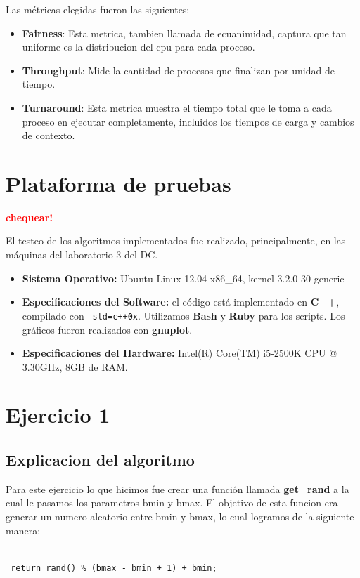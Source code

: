 \documentclass[a4paper]{article}
\begin{document}
Las métricas elegidas fueron las siguientes:
\begin{itemize}

\item \textbf{Fairness}: Esta metrica, tambien llamada de ecuanimidad,
captura que tan uniforme es la distribucion del cpu para
cada proceso.

\item \textbf{Throughput}: Mide la cantidad de procesos que
finalizan por unidad de tiempo.

\item \textbf{Turnaround}: Esta metrica muestra el tiempo total que le toma
a cada proceso en ejecutar completamente, incluidos los tiempos de carga y
cambios de contexto.


\end{itemize}
\newpage

\section{Plataforma de pruebas}

\textcolor{red}{\textbf{chequear!}} \medskip

El testeo de los algoritmos implementados fue realizado, principalmente, en las máquinas del laboratorio 3 del DC. \newline
\begin{itemize}
  \item \textbf{Sistema Operativo:} Ubuntu Linux 12.04 x86_64, kernel 3.2.0-30-generic

  \item \textbf{Especificaciones del Software:} el código está implementado en \textbf{C++}, compilado con \verb|-std=c++0x|.
  Utilizamos \textbf{Bash} y \textbf{Ruby} para los scripts. Los gráficos fueron realizados con \textbf{gnuplot}.

  \item \textbf{Especificaciones del Hardware:} Intel(R) Core(TM) i5-2500K CPU @ 3.30GHz, 8GB de RAM.
\end{itemize}

\newpage


 \section{Ejercicio 1}

 \subsection{Explicacion del algoritmo}
 Para este ejercicio lo que hicimos fue crear una funci\'on llamada
 \textbf{get\_rand} a la cual le pasamos los parametros bmin y bmax. El
 objetivo de esta funcion era generar un numero aleatorio entre bmin y bmax,
 lo cual logramos de la siguiente manera:
 \begin{verbatim}

 return rand() % (bmax - bmin + 1) + bmin;

 \end{verbatim}
\end{document}
